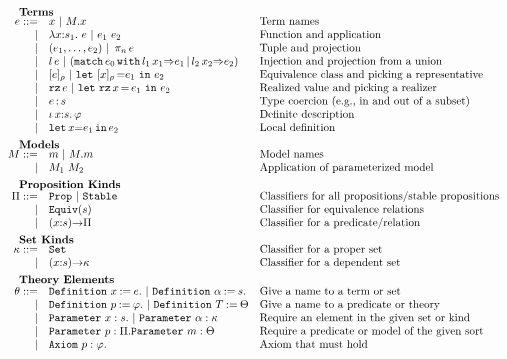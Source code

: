 \begin{figure}
\[\begin{array}{rl@{\quad}l}
		\noalign{\textbf{Terms}}	
		\ie ::=
		    & \ix \ibar \iselect{\im}{\ix} &\mbox{Term names}\\
		  | & \ilambda{\ix}{\is_1}{\ie} \ibar 
		      \iapp{\ie_1}{\ie_2} &\mbox{Function and application}\\
		  | & \ituple{\ie_1}{\ie_2} 
		      \ibar \iproj{\ie}{n}&\mbox{Tuple and projection}\\
		  | & \iinj{\il}{\ie} 
		      \ibar (\imatch{\ie_0}{\il_1}{\ix_1}{\ie_1}{\il_2}{\ix_2}{\ie_2})&\mbox{Injection and projection from a union}\\
		  | & \ieclass{\ie}{\ipp}
		      \ibar \ileteclass{\ix}{\ipp}{\ie_1}{\ie_2}&\mbox{Equivalence class and picking a representative}\\
		  | & \irz{\ie}
		      \ibar \iletrz{\ix}{\ie_1}{\ie_2}&\mbox{Realized value and picking a realizer}\\
		  | & \icoerce{\ie}{\is} &\mbox{Type coercion (e.g., in and out of a subset)}\\
		  | & \ithe{\ix}{\is}{\ip}&\mbox{Definite description}\\
		  | & \ilet{\ix}{\ie_1}{\ie_2}&\mbox{Local definition}\\[5pt]
		
		\noalign{\textbf{Models}}		
		\im ::= 
		    & \iM  \ibar \iselect{\im}{\iM}&\mbox{Model names}\\
		  | & \iapp{\im_1}{\im_2}&\mbox{Application of parameterized model}\\[5pt]
		
		\noalign{\textbf{Proposition Kinds}}
		\ipt ::=
		    & \iProp \ibar \iStable & \mbox{Classifiers for all propositions/stable propositions}\\
		  | & \iEquiv{\is} &\mbox{Classifier for equivalence relations}\\
		  | & \idarrow{\ix}{\is}{\ipt} & \mbox{Classifier for a predicate/relation}\\[5pt] 
		
		\noalign{\textbf{Set Kinds}}
		\ik ::= 
		    & \iSet &\mbox{Classifier for a proper set}\\
		   | & \idarrow{\ix}{\is}{\ik} &\mbox{Classifier for a dependent set}\\[5pt]
		

		\noalign{\textbf{Theory Elements}}
		\ite ::=
		     & \iDefinition{\ix}{\ie}.\ibar\iDefinition{\iS}{\is}.&\mbox{Give a name to a term or set}\\
		   | & \iDefinition{\iP}{\ip}.\ibar\iDefinition{\iTH}{\ith}&\mbox{Give a name to a predicate or theory}\\
		   | & \iParameter{\ix}{\is}.\ibar\iParameter{\iS}{\ik}&\mbox{Require an element in the given set or kind}\\
		   | & \iParameter{\iP}{\ipt}.\iParameter{\iM}{\ith}&\mbox{Require a predicate or model of the given sort}\\
		   | & \iAxiom{\iP}{\ip}.&\mbox{Axiom that must hold}\\[5pt]


\end{array}\]
\end{figure}
